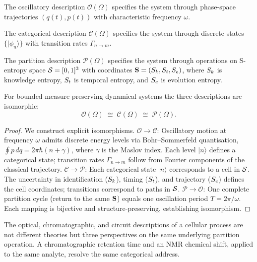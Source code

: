 \begin{definition}
The oscillatory description $\mathcal{O}(\Omega)$ specifies the system
through phase-space trajectories $(q(t),p(t))$ with characteristic
frequency $\omega$.
\end{definition}

\begin{definition}
The categorical description $\mathcal{C}(\Omega)$ specifies the system
through discrete states $\{|\phi_n\rangle\}$ with transition rates
$\Gamma_{n\to m}$.
\end{definition}

\begin{definition}
The partition description $\mathcal{P}(\Omega)$ specifies the system through
operations on S-entropy space $\mathcal{S} = [0,1]^3$ with coordinates
$\mathbf{S} = (S_k, S_t, S_e)$, where $S_k$ is knowledge entropy, $S_t$ is
temporal entropy, and $S_e$ is evolution entropy.
\end{definition}

\begin{theorem}
\label{thm:triple-equiv}
For bounded measure-preserving dynamical systems the three descriptions are
isomorphic:
\[
    \mathcal{O}(\Omega) \;\cong\; \mathcal{C}(\Omega) \;\cong\; \mathcal{P}(\Omega).
\]
\end{theorem}

\begin{proof}
We construct explicit isomorphisms.  $\mathcal{O}\to\mathcal{C}$: Oscillatory
motion at frequency $\omega$ admits discrete energy levels via
Bohr--Sommerfeld quantisation, $\oint p\,dq = 2\pi\hbar(n+\gamma)$, where
$\gamma$ is the Maslov index.  Each level $|n\rangle$ defines a categorical
state; transition rates $\Gamma_{n\to m}$ follow from Fourier components of
the classical trajectory.  $\mathcal{C}\to\mathcal{P}$: Each categorical state
$|n\rangle$ corresponds to a cell in $\mathcal{S}$.  The uncertainty in
identification ($S_k$), timing ($S_t$), and trajectory ($S_e$) defines the
cell coordinates; transitions correspond to paths in $\mathcal{S}$.
$\mathcal{P}\to\mathcal{O}$: One complete partition cycle (return to the same
$\mathbf{S}$) equals one oscillation period $T = 2\pi/\omega$.  Each mapping is
bijective and structure-preserving, establishing isomorphism.
\end{proof}

\begin{corollary}
The optical, chromatographic, and circuit descriptions of a cellular process
are not different theories but three perspectives on the same underlying
partition operation.  A chromatographic retention time and an NMR chemical
shift, applied to the same analyte, resolve the same categorical address.
\end{corollary}

